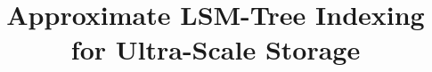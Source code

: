 \usepackage{tikz}
\usepackage{amsmath}


\usepackage{lipsum}
\usepackage{titlesec}





\setlength{\abovecaptionskip}{1ex}
\setlength{\belowcaptionskip}{1ex}
\setlength{\floatsep}{2.0pt}
\setlength{\textfloatsep}{2.0pt}

\usepackage{lipsum}
\usepackage{titlesec}





\date{}

\title{\Large \bf Approximate LSM-Tree Indexing for Ultra-Scale Storage}

\begin{comment}
\author{
{\rm Your N.\ Here}\\
Your Institution
\and
{\rm Second Name}\\
Second Institution
} %
\end{comment}

